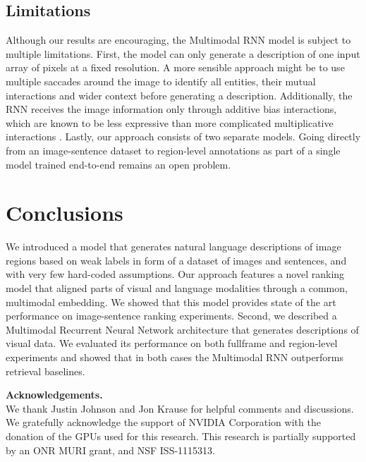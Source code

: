 \documentclass[10pt,twocolumn,letterpaper]{article}
\begin{document}
\vspace{-0.1in}
\subsection{Limitations}
\vspace{-0.15in}

Although our results are encouraging, the Multimodal RNN model is subject to multiple limitations. First, the model can only generate a description of one input array of pixels at a fixed resolution. A more sensible approach might be to use multiple saccades around the image to identify all entities, their mutual interactions and wider context before generating a description. Additionally, the RNN receives the image information only through additive bias interactions, which are known to be less expressive than more complicated multiplicative interactions \cite{sutskever2011generating,hochreiter1997long}. Lastly, our approach consists of two separate models. Going directly from an image-sentence dataset to region-level annotations as part of a single model trained end-to-end remains an open problem.

\vspace{-0.15in}
\section{Conclusions}
\vspace{-0.15in}

We introduced a model that generates natural language descriptions of image regions based on weak labels in form of a dataset of images and sentences, and with very few hard-coded assumptions. Our approach features a novel ranking model that aligned parts of visual and language modalities through a common, multimodal embedding. We showed that this model provides state of the art performance on image-sentence ranking experiments. Second, we described a Multimodal Recurrent Neural Network architecture that generates descriptions of visual data. We evaluated its performance on both fullframe and region-level experiments and showed that in both cases the Multimodal RNN outperforms retrieval baselines.

\textbf{Acknowledgements.}\\
We thank Justin Johnson and Jon Krause for helpful comments and discussions. We gratefully acknowledge the support of NVIDIA Corporation with the donation of the GPUs used for this research. This research is partially supported by an ONR MURI grant, and NSF ISS-1115313.
\end{document}
